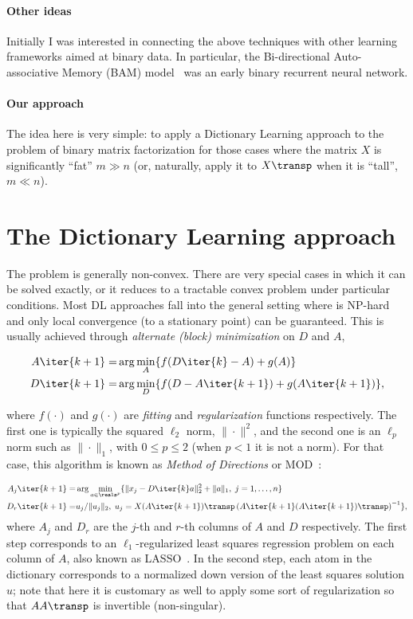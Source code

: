\documentclass[a4paper,11pt]{article}
\begin{document}
\paragraph{Other ideas} Initially I was interested in connecting the above techniques with other learning frameworks aimed at binary data. In particular, the Bi-directional Auto-associative Memory (BAM) model~\cite{bam} was an early binary recurrent neural network.


\paragraph{Our approach} The idea here is very simple: to apply a Dictionary Learning approach to the problem of binary matrix factorization for those cases where the matrix $X$ is significantly ``fat'' $m \gg n$ (or, naturally, apply it to $X\transp$ when it is ``tall'', $m \ll n$). 

\section{The Dictionary Learning approach}

The problem  is generally non-convex. There are very special cases in which it can be solved exactly, or it reduces to a tractable convex problem under particular conditions. Most DL approaches fall into the general setting where  is NP-hard and only local convergence (to a stationary point) can be guaranteed. This is usually achieved through \emph{alternate (block) minimization} on $D$ and $A$,

\begin{eqnarray}
A\iter{k+1} =& \arg\min_{A} \{ f(D\iter{k}-A) + g(A) \} \\
D\iter{k+1} =& \arg\min_{D} \{ f(D-A\iter{k+1}) + g(A\iter{k+1}) \},
\label{eq:dl}
\end{eqnarray}

where $f(\cdot)$ and $g(\cdot)$ are \emph{fitting} and \emph{regularization} functions respectively. The first one is typically the squared $\ell_2$ norm, $\|\cdot\|^2$, and the second one is an $\ell_p$ norm such as $\|\cdot\|_1$, with $0 \leq p \leq 2$ (when $p < 1$ it is not a norm). For that case, this algorithm is known as \emph{Method of Directions} or MOD~\cite{mod}:

\begin{eqnarray}
A_j\iter{k+1} =& \arg\min_{a \in \reals^p} \{ \|x_j - D\iter{k}a \|_2^2 + \|a\|_1,  \; j=1,\ldots,n \} \\
D_r\iter{k+1} =& u_j/\|u_j\|_2,\;u_j = X(A\iter{k+1})\transp\left(A\iter{k+1}(A\iter{k+1})\transp\right)^{-1} \}, 
\label{eq:mod}
\end{eqnarray}
where $A_j$ and $D_r$ are the $j$-th and $r$-th columns of $A$ and $D$ respectively. The first step corresponds to an $\ell_1$-regularized least squares regression problem on each column of $A$, also known as LASSO~\cite{lasso}.
In the second step, each atom in the dictionary corresponds to a normalized down version of the least squares solution $u$; note that here it is customary as well to apply some sort of regularization so that $AA\transp$ is invertible (non-singular).
\end{document}
